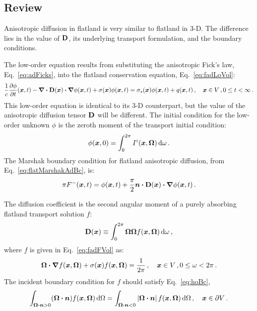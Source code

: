 \subsection{Review}

Anisotropic diffusion in flatland is very similar to flatland in 3-D. The
difference lies in the value of $\mathbf{D}$, its underlying transport formulation,
and the boundary conditions.

The low-order equation results from substituting the anisotropic Fick's law,
Eq.~\eqref{eq:adFicks}, into the flatland conservation equation,
Eq.~\eqref{eq:fadLoVol}:
\begin{equation*}
\frac{1}{c} \frac{\partial \phi}{\partial t} (\bm{x}, t)
  - \bm{\nabla} \bm{\cdot} \mathbf{D}(\bm{x}) \bm{\cdot} \bm{\nabla} \phi(\bm{x}, t)
  + \sigma(\bm{x}) \phi(\bm{x}, t)
  = \sigma_s(\bm{x}) \phi(\bm{x},t) + q(\bm{x},t)\,,\quad \bm{x}\in V\,,
  0 \le t < \infty\,.
\end{equation*}
This low-order equation is identical to its 3-D counterpart, but the value of
the anisotropic diffusion tensor $\mathbf{D}$ will be different.
The initial condition for the low-order unknown $\phi$ is the zeroth moment of
the transport initial condition:
\begin{equation*}
  \phi(\bm{x},0) = \int_{0}^{2\pi} I^i(\bm{x},\bm{\Omega}) \mathop{}\!\mathrm{d}\omega\,.
\end{equation*}
The Marshak boundary condition for flatland anisotropic diffusion, from
Eq.~\eqref{eq:flatMarshakAdBc}, is:
\begin{equation*}
\pi F^-(\bm{x},t) 
=
\phi(\bm{x},t)
+ \frac{\pi}{2}\bm{n} \bm{\cdot} \mathbf{D}(\bm{x}) \bm{\cdot} \bm{\nabla} \phi(\bm{x},t) \,.
\end{equation*}

The diffusion coefficient is the second angular moment of a purely absorbing
flatland transport solution $f$:
\begin{equation*}
  \mathbf{D}(\bm{x}) \equiv \int_{0}^{2\pi} \bm{\Omega} \bm{\Omega}
  f(\bm{x}, \bm{\Omega}) \mathop{}\!\mathrm{d}\omega \,,
\end{equation*}
where $f$ is given in Eq.~\eqref{eq:fadFVol} as:
\begin{equation*}
  \bm{\Omega}\bm{\cdot} \bm{\nabla} f(\bm{x}, \bm{\Omega})
  + \sigma(\bm{x}) f (\bm{x}, \bm{\Omega})
= \frac{1}{2\pi} \,, \quad \bm{x}\in V\,, 0 \le \omega < 2\pi \,.
\end{equation*}
The incident boundary condition for $f$ should satisfy Eq.~\eqref{eq:hoBc},
\begin{equation*}
  \int_{\bm{\Omega}\bm{\cdot}\bm{n} > 0} (\bm{\Omega}\bm{\cdot} \bm{n})
  f(\bm{x}, \bm{\Omega}) \mathop{}\!\mathrm{d}\Omega
  =
  \int_{\bm{\Omega}\bm{\cdot}\bm{n} < 0} \left| \bm{\Omega}\bm{\cdot} \bm{n} \right|
  f(\bm{x}, \bm{\Omega}) \mathop{}\!\mathrm{d}\Omega\,, \quad \bm{x}\in \partial V \,.
\end{equation*}

